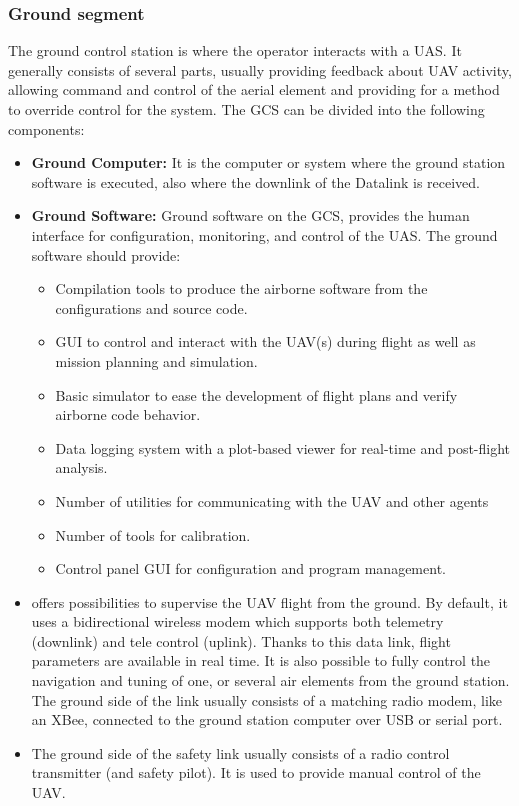 \subsubsection{Ground segment} 
The ground control station is where the operator interacts with a UAS. It generally consists of several parts, usually providing feedback about UAV activity, allowing command and control of the aerial element and providing for a method to override control for the system.
The GCS can be divided into the following components:
\begin{itemize}
    \item \textbf{Ground Computer:} It is the computer or system where the ground station software is executed, also where the downlink of the Datalink is received.
    \item \textbf{Ground Software:}  Ground software on the GCS, provides the human interface for configuration, monitoring, and control of the UAS. The ground software should provide:
    \begin{itemize}
        \item Compilation tools to produce the airborne software from the configurations and source code.
        \item GUI to control and interact with the UAV(s) during flight as well as mission planning and simulation.
        \item Basic simulator to ease the development of flight plans and verify airborne code behavior.
        \item Data logging system with a plot-based viewer for real-time and post-flight analysis.
        \item Number of utilities for communicating with the UAV and other agents
        \item Number of tools for calibration.
        \item Control panel GUI for configuration and program management.
    \end{itemize}
    \item {} offers possibilities to supervise the UAV flight from the ground. By default, it uses a bidirectional wireless modem which supports both telemetry (downlink) and tele control (uplink). Thanks to this data link, flight parameters are available in real time. It is also possible to fully control the navigation and tuning of one, or several air elements from the ground station. The ground side of the link usually consists of a matching radio modem, like an XBee, connected to the ground station computer over USB or serial port.
    \item {} The ground side of the safety link usually consists of a radio control transmitter (and safety pilot). It is used to provide manual control of the UAV.
\end{itemize}
